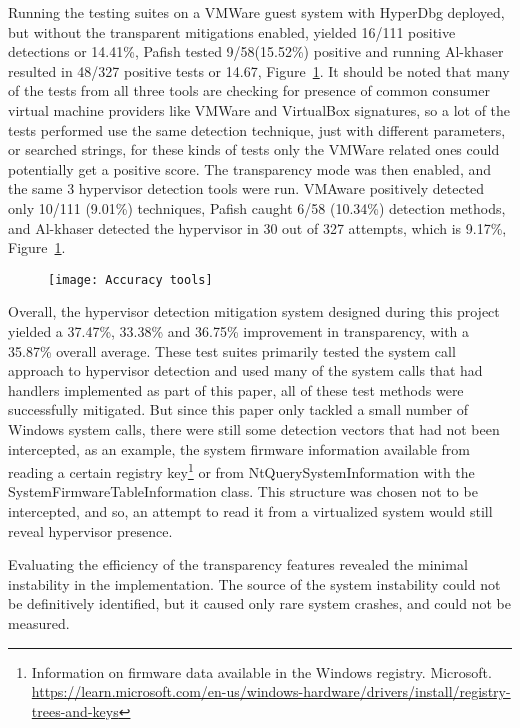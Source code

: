 Running the testing suites on a VMWare guest system with HyperDbg deployed, but without the transparent mitigations enabled, yielded 16/111 positive detections or 14.41\%, 
Pafish tested 9/58(15.52\%) positive and running Al-khaser resulted in 48/327 positive tests or 14.67, Figure~\ref{fig:test_accuracy}.
It should be noted that many of the tests from all three tools are checking for presence of common consumer virtual machine providers like VMWare and VirtualBox signatures, 
so a lot of the tests performed use the same detection technique, just with different parameters, or searched strings, for these kinds of tests only the VMWare related ones could potentially get a positive score. 
The transparency mode was then enabled, and the same 3 hypervisor detection tools were run. VMAware positively detected only 10/111 (9.01\%) techniques, Pafish caught 6/58 (10.34\%) detection methods, and 
Al-khaser detected the hypervisor in 30 out of 327 attempts, which is 9.17\%, Figure~\ref{fig:test_accuracy}.
\begin{figure}[tbh]
    \texttt{[image: Accuracy tools]} %
    \label{fig:test_accuracy}
\end{figure}

Overall, the hypervisor detection mitigation system designed during this project yielded a 37.47\%, 33.38\% and 36.75\% improvement in transparency, 
with a 35.87\% overall average. These test suites primarily tested the system call approach to hypervisor detection and used many of the system calls that had handlers implemented as part of this paper, 
all of these test methods were successfully mitigated. But since this paper only tackled a small number of Windows system calls, there were still some detection vectors that had not been intercepted, 
as an example, the system firmware information available from reading a certain registry key\footnote{Information on firmware data available in the Windows registry. Microsoft. \url{https://learn.microsoft.com/en-us/windows-hardware/drivers/install/registry-trees-and-keys}} 
or from NtQuerySystemInformation with the SystemFirmwareTableInformation class. This structure was chosen not to be intercepted, and so, 
an attempt to read it from a virtualized system would still reveal hypervisor presence.

Evaluating the efficiency of the transparency features revealed the minimal instability in the implementation. The source of the system instability 
could not be definitively identified, but it caused only rare system crashes, and could not be measured.


